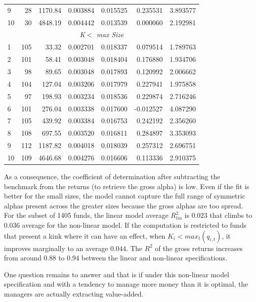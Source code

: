 \documentclass[12pt]{article}
\begin{document}
\begin{table}[h!]
\begin{threeparttable}
\begin{tabular}{lrrrrrr}
            9 & 28 & 1170.84 & 0.003884 & 0.015525 & 0.235531 & 3.893577 \\
            10 & 30 & 4848.19 & 0.004442 & 0.013539 & 0.000060 & 2.192981 \\
            \midrule
            \multicolumn{7}{c}{\textit{K$<$ max Size}} \\
            \midrule
            1 & 105 & 33.32 & 0.002701 & 0.018337 & 0.079514 & 1.789763 \\
            2 & 101 & 58.41 & 0.003048 & 0.018404 & 0.176880 & 1.934706 \\
            3 & 98 & 89.65 & 0.003048 & 0.017893 & 0.120992 & 2.006662 \\
            4 & 104 & 127.04 & 0.003206 & 0.017979 & 0.227941 & 1.975858 \\
            5 & 97 & 198.93 & 0.003234 & 0.018536 & 0.229874 & 2.716246 \\
            6 & 101 & 276.04 & 0.003338 & 0.017600 & -0.012527 & 4.087290 \\
            7 & 105 & 439.92 & 0.003384 & 0.016753 & 0.242192 & 2.356260 \\
            8 & 108 & 697.55 & 0.003520 & 0.016811 & 0.284897 & 3.353093 \\
            9 & 112 & 1187.82 & 0.004018 & 0.018039 & 0.257312 & 2.696751 \\
            10 & 109 & 4646.68 & 0.004276 & 0.016606 & 0.113336 & 2.910375 \\
            \bottomrule
            \bottomrule
        \end{tabular}
    \end{threeparttable}
\end{table}


As a consequence, the coefficient of determination after subtracting the benchmark from the returns (to retrieve the gross alpha) is low. Even if the fit is better for the small sizes, the model cannot capture the full range of symmetric alphas present across the greater sizes because the gross alphas are too spread. For the subset of 1405 funds, the linear model average $R^2_{lin}$ is $0.023$ that climbs to $0.036$ average for the non-linear model. If the computation is restricted to funds that present a kink where it can have an effect, when $K_i<max_t(q_{i,t})$, it improves marginally to an average $0.044$. The $R^2$ of the gross returns increases from around 0.88 to 0.94 between the linear and non-linear specifications.


\par
One question remains to answer and that is if under this non-linear model specification and with a tendency to manage more money than it is optimal, the managers are actually extracting value-added. 
\end{document}
